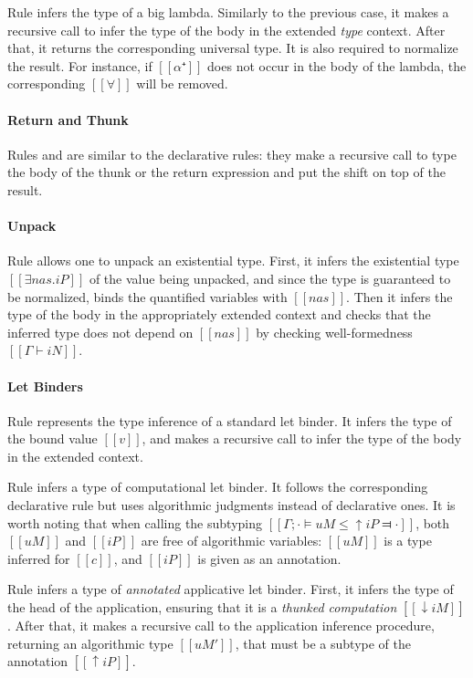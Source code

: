   Rule  infers the type of a big lambda.
  Similarly to the previous case, it makes a recursive call to infer the type
  of the body in the extended \emph{type} context. 
  After that, it returns the corresponding universal type. 
  It is also required to normalize the result.  
  For instance, if $[[α⁺]]$ does not occur in the body of the lambda,
  the corresponding $[[∀]]$ will be removed.

\paragraph*{Return and Thunk}
  Rules  and 
  are similar to the declarative rules: they make a recursive call
  to type the body of the thunk or the return expression and
  put the shift on top of the result.

\paragraph*{Unpack}
  Rule 
  allows one to unpack an existential type.
  First, it infers the existential type $[[∃nas.iP]]$ of the value being unpacked,
  and since the type is guaranteed to be normalized, binds 
  the quantified variables with $[[nas]]$.
  Then it infers the type of the body in the appropriately extended context
  and checks that the inferred type does not depend on $[[nas]]$
  by checking well-formedness $[[Γ ⊢ iN]]$.

\paragraph*{Let Binders}
  Rule  represents the type inference of a
  standard let binder. It infers the type of the bound value $[[v]]$, and makes
  a recursive call to infer the type of the body in the extended context.

  Rule  infers a type of computational let
  binder. It follows the corresponding declarative rule
   but uses algorithmic judgments instead of
  declarative ones. It is worth noting that when calling the subtyping 
  $[[Γ ; · ⊨ uM ≤ ↑iP ⫤ ·]]$, both $[[uM]]$ and $[[iP]]$ are free of algorithmic
  variables: $[[uM]]$ is a type inferred for $[[c]]$, and $[[iP]]$ is given as
  an annotation.

  Rule 
  infers a type of \emph{annotated} applicative let binder.
  First, it infers the type of the head of the application,
  ensuring that it is a \emph{thunked computation} $[[↓iM]]$.
  After that, it makes a recursive call
  to the application inference procedure,
  returning an algorithmic type $[[uM']]$, 
  that must be a subtype of the annotation $[[↑iP]]$.

